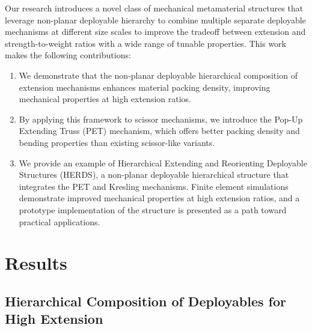Our research introduces a novel class of mechanical metamaterial structures that leverage {non-planar deployable }hierarchy to combine multiple separate deployable mechanisms at different size scales to improve the tradeoff between extension and strength-to-weight ratios with a wide range of tunable properties. This work makes the following contributions:
\begin{enumerate}
    \item We demonstrate that the non-planar {deployable }hierarchical composition of extension mechanisms enhances material packing density, improving mechanical properties at high extension ratios.
    \item By applying this framework to scissor mechanisms, we introduce the Pop-Up Extending Truss (PET) mechanism, which offers better packing density and bending properties than existing scissor-like variants.
    \item We provide an example of Hierarchical Extending and Reorienting Deployable Structures (HERDS), a {non-planar deployable hierarchical structure} that integrates the PET and Kresling mechanisms. Finite element simulations demonstrate improved mechanical properties at high extension ratios, and a prototype implementation of the structure is presented as a path toward practical applications.
\end{enumerate}


\section{Results}
\subsection{Hierarchical Composition {of Deployables} for High Extension}
